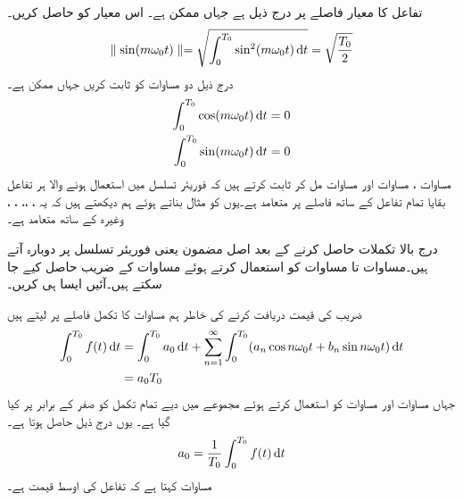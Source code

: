 تفاعل  کا معیار  فاصلے پر درج ذیل ہے جہاں  ممکن ہے۔ اس معیار کو حاصل کریں۔
\begin{align}\label{مساوات_فوریئر_مختلف_تکمل_ٹ}
\parallel \sin (m\omega_0 t) \parallel =\sqrt{\int_0^{T_0} \sin^2 (m\omega_0 t) \dif t}=\sqrt{\frac{T_0}{2}}
\end{align}
درج ذیل دو مساوات کو ثابت کریں جہاں  ممکن ہے۔
\begin{align}
\int_0^{T_0} \cos (m\omega_0 t) \dif t&=0 \label{مساوات_فوریئر_مختلف_تکمل_ث}\\
\int_0^{T_0} \sin (m\omega_0 t) \dif t&=0\label{مساوات_فوریئر_مختلف_تکمل_ج}
\end{align}
مساوات ، مساوات  اور مساوات  مل کر ثابت کرتے ہیں کہ فوریئر تسلسل میں استعمال ہونے والا ہر تفاعل بقایا تمام تفاعل کے ساتھ  فاصلے پر متعامد ہے۔یوں  کو مثال بناتے ہوئے ہم دیکھتے ہیں کہ یہ ، ،، ، ،  وغیرہ کے ساتھ متعامد ہے۔

درج بالا تکملات حاصل کرنے کے بعد اصل مضمون یعنی فوریئر تسلسل پر دوبارہ آتے ہیں۔مساوات  تا مساوات  کو استعمال کرتے ہوئے مساوات   کے  ضریب   حاصل کیے جا سکتے ہیں۔آئیں ایسا ہی کریں۔

 ضریب   کی قیمت دریافت کرنے کی خاطر ہم  مساوات   کا تکمل  فاصلے پر لیتے ہیں
\begin{align*}
\int_0^{T_0}f(t) \dif t&=\int_0^{T_0} a_0 \dif t+\sum_{n=1}^{\infty}  \int_0^{T_0}(a_n\cos n \omega_0 t +b_n \sin n \omega_0 t) \dif t\\
&=a_0 T_0
\end{align*}
جہاں مساوات  اور مساوات  کو استعمال کرتے ہوئے مجموعے میں دیے تمام تکمل کو صفر کے برابر پر کیا گیا ہے۔ یوں درج ذیل حاصل ہوتا ہے۔
\begin{align}\label{مساوات_فوریئر_عددی_سر_الف}
a_0=\frac{1}{T_0}\int_0^{T_0}f(t) \dif t
\end{align}
مساوات  کہتا ہے کہ  تفاعل  کی اوسط قیمت ہے۔



